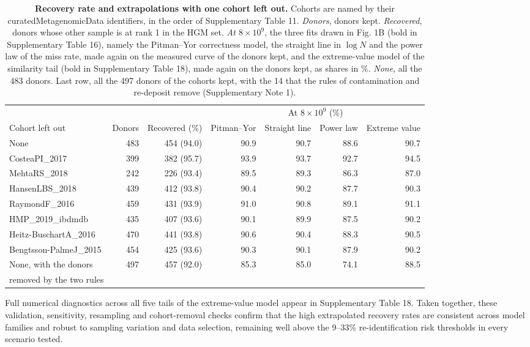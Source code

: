 \documentclass[11pt,a4paper]{article}
\begin{document}
\setcounter{table}{16}
\begin{table}[!htbp]\centering\small\setlength{\tabcolsep}{3.4pt}
\caption[Recovery rate and extrapolations with one cohort left out]{\textbf{Recovery rate and extrapolations with one cohort left out.} Cohorts are named by their curatedMetagenomicData identifiers, in the order of Supplementary Table 11. \textit{Donors}, donors kept. \textit{Recovered}, donors whose other sample is at rank 1 in the HGM set. \textit{At $8\times10^9$}, the three fits drawn in Fig. 1B (bold in Supplementary Table 16), namely the Pitman--Yor correctness model, the straight line in $\log N$ and the power law of the miss rate, made again on the measured curve of the donors kept, and the extreme-value model of the similarity tail (bold in Supplementary Table 18), made again on the donors kept, as shares in \%. \textit{None}, all the 483 donors. Last row, all the 497 donors of the cohorts kept, with the 14 that the rules of contamination and re-deposit remove (Supplementary Note 1).}
\begin{tabular}{lrrrrrr}
\toprule
 & & & \multicolumn{4}{c}{At $8\times10^9$ (\%)} \\
\cmidrule(lr){4-7}
Cohort left out & Donors & Recovered (\%) & Pitman--Yor & Straight line & Power law & Extreme value \\
\midrule
None & 483 & 454 (94.0) & 90.9 & 90.7 & 88.6 & 90.7 \\
CosteaPI\_2017 & 399 & 382 (95.7) & 93.9 & 93.7 & 92.7 & 94.5 \\
MehtaRS\_2018 & 242 & 226 (93.4) & 89.5 & 89.3 & 86.3 & 87.0 \\
HansenLBS\_2018 & 439 & 412 (93.8) & 90.4 & 90.2 & 87.7 & 90.3 \\
RaymondF\_2016 & 459 & 431 (93.9) & 91.0 & 90.8 & 89.1 & 91.1 \\
HMP\_2019\_ibdmdb & 435 & 407 (93.6) & 90.1 & 89.9 & 87.5 & 90.2 \\
Heitz-BuschartA\_2016 & 470 & 441 (93.8) & 90.6 & 90.4 & 88.3 & 90.5 \\
Bengtsson-PalmeJ\_2015 & 454 & 425 (93.6) & 90.3 & 90.1 & 87.9 & 90.2 \\
\midrule
None, with the donors & 497 & 457 (92.0) & 85.3 & 85.0 & 74.1 & 88.5 \\
removed by the two rules & & & & & & \\
\bottomrule
\end{tabular}
\end{table}

Full numerical diagnostics across all five tails of the extreme-value model appear in Supplementary Table 18. Taken together, these validation, sensitivity, resampling and cohort-removal checks confirm that the high extrapolated recovery rates are consistent across model families and robust to sampling variation and data selection, remaining well above the 9--33\% re-identification risk thresholds in every scenario tested.
\end{document}
